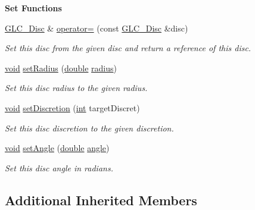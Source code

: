 \begin{Indent}{\bf Set Functions}\par
\begin{DoxyCompactItemize}
\item 
\hyperlink{class_g_l_c___disc}{G\-L\-C\-\_\-\-Disc} \& \hyperlink{class_g_l_c___disc_a6f0768940370866d1220a3f8065d56e9}{operator=} (const \hyperlink{class_g_l_c___disc}{G\-L\-C\-\_\-\-Disc} \&disc)
\begin{DoxyCompactList}\small\item\em Set this disc from the given disc and return a reference of this disc. \end{DoxyCompactList}\item 
\hyperlink{group___u_a_v_objects_plugin_ga444cf2ff3f0ecbe028adce838d373f5c}{void} \hyperlink{class_g_l_c___disc_a3137bd243fedcfa192c546aa16ce9e67}{set\-Radius} (\hyperlink{_super_l_u_support_8h_a8956b2b9f49bf918deed98379d159ca7}{double} \hyperlink{class_g_l_c___disc_ab5dc631e888b10d7f24784d98c957315}{radius})
\begin{DoxyCompactList}\small\item\em Set this disc radius to the given radius. \end{DoxyCompactList}\item 
\hyperlink{group___u_a_v_objects_plugin_ga444cf2ff3f0ecbe028adce838d373f5c}{void} \hyperlink{class_g_l_c___disc_afe54cbc02ebdee4d99eeb66afb18e4f1}{set\-Discretion} (\hyperlink{ioapi_8h_a787fa3cf048117ba7123753c1e74fcd6}{int} target\-Discret)
\begin{DoxyCompactList}\small\item\em Set this disc discretion to the given discretion. \end{DoxyCompactList}\item 
\hyperlink{group___u_a_v_objects_plugin_ga444cf2ff3f0ecbe028adce838d373f5c}{void} \hyperlink{class_g_l_c___disc_a869ff5036d4a49a2cb3f48bfd4cbe005}{set\-Angle} (\hyperlink{_super_l_u_support_8h_a8956b2b9f49bf918deed98379d159ca7}{double} \hyperlink{glext_8h_a9e06c1f76a20fed54ca742cd25cb02c4}{angle})
\begin{DoxyCompactList}\small\item\em Set this disc angle in radians. \end{DoxyCompactList}\end{DoxyCompactItemize}
\end{Indent}
\subsection*{Additional Inherited Members}


